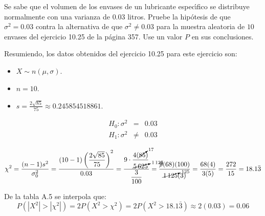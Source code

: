 \begin{enunciado}
 Se sabe que el volumen de los envases de un lubricante espec\'{\i}fico
 se distribuye normalmente con una varianza de $0.03$ litros.
 Pruebe la hip\'otesis de que $\sigma^2 = 0.03$
 contra la alternativa de que $\sigma^2 \neq 0.03$
 para la muestra aleatoria de $10$ envases del ejercicio 10.25
 de la p\'agina 357.
 Use un valor $P$ en sus conclusiones.
\end{enunciado}

\begin{solucion}
 \begin{datos}
  Resumiendo, los datos obtenidos del ejercicio 10.25 para este ejercicio son:
  \begin{itemize}
   \item $X \sim n\left( \mu, \sigma \right)$.
   \item $n = 10$.
   \item $s = \frac{2\sqrt{85}}{75} \approx 0.245854518861$.
  \end{itemize}
 \end{datos}

 \begin{hipotesis}
  \begin{eqnarray*}
   H_0: \sigma^2 &  =   & 0.03 \\
   H_1: \sigma^2 & \neq & 0.03
  \end{eqnarray*}
 \end{hipotesis}

 \begin{estadistico}
  \begin{equation*}
   \chi^2 = \frac{(n-1)s^2}{\sigma_0^2}
   = \frac{\displaystyle{ (10-1)\left( \frac{2\sqrt{85}}{75} \right)^2 }}{0.03}
   = \frac{
   \displaystyle{9\cdot \frac{4(\cancelto{17}{85})}{\cancelto{1\,125}{5\,625}}}
   }{
   \displaystyle{\frac{3}{100}}
   }
   = \frac{\cancel{9}(68)(100)}{\cancelto{125}{1\,125}(3)}
   = \frac{68(4)}{3(5)} = \frac{272}{15} = 18.1\bar{3}
  \end{equation*}
 \end{estadistico}

 \begin{valorp}
  De la tabla A.5 se interpola que:
  \begin{equation*}
   P\left( \left| X^2 \right| > \left| \chi^2 \right| \right)
   = 2P\left( X^2 > \chi^2 \right)
   = 2P( X^2 > 18.1\bar{3}) \approx 2(0.03) = 0.06
  \end{equation*}
 \end{valorp}


\end{solucion}
